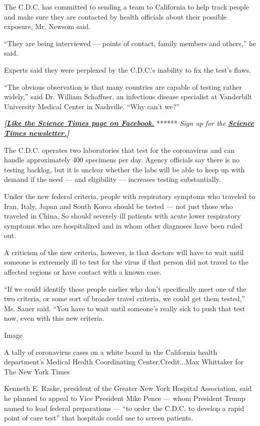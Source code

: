 The C.D.C. has committed to sending a team to California to help track
people and make sure they are contacted by health officials about their
possible exposure, Mr. Newsom said.

``They are being interviewed --- points of contact, family members and
others,'' he said.

Experts said they were perplexed by the C.D.C.'s inability to fix the
test's flaws.

``The obvious observation is that many countries are capable of testing
rather widely,'' said Dr. William Schaffner, an infectious disease
specialist at Vanderbilt University Medical Center in Nashville. ``Why
can't we?''

\textbf{\emph{{[}}\href{http://on.fb.me/1paTQ1h}{\emph{Like the Science
Times page on Facebook.}}} ****** \emph{\textbar{} Sign up for the}
\textbf{\href{http://nyti.ms/1MbHaRU}{\emph{Science Times
newsletter.}}\emph{{]}}}

The C.D.C. operates two laboratories that test for the coronavirus and
can handle approximately 400 specimens per day. Agency officials say
there is no testing backlog, but it is unclear whether the labs will be
able to keep up with demand if the need --- and eligibility ---
increases testing substantially.

Under the new federal criteria, people with respiratory symptoms who
traveled to Iran, Italy, Japan and South Korea should be tested --- not
just those who traveled in China. So should severely ill patients with
acute lower respiratory symptoms who are hospitalized and in whom other
diagnoses have been ruled out.

A criticism of the new criteria, however, is that doctors will have to
wait until someone is extremely ill to test for the virus if that person
did not travel to the affected regions or have contact with a known
case.

``If we could identify these people earlier who don't specifically meet
one of the two criteria, or some sort of broader travel criteria, we
could get them tested,'' Ms. Sauer said. ``You have to wait until
someone's really sick to push that test now, even with this new
criteria.

Image

A tally of coronavirus cases on a white board in the California health
department's Medical Health Coordinating Center.Credit...Max Whittaker
for The New York Times

Kenneth E. Raske, president of the Greater New York Hospital
Association, said he planned to appeal to Vice President Mike Pence ---
whom President Trump named to lead federal preparations --- ``to order
the C.D.C. to develop a rapid point of care test'' that hospitals could
use to screen patients.

